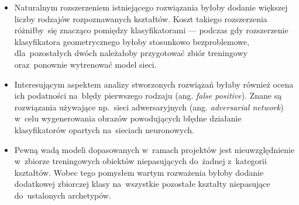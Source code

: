 \documentclass[11pt,a4paper]{article}
\begin{document}
\begin{itemize}
    \item Naturalnym rozszerzeniem istniejącego rozwiązania byłoby dodanie większej liczby rodzajów rozpoznawanych kształtów.
    Koszt takiego rozszerzenia różniłby~się znacząco pomiędzy klasyfikatorami --- podczas gdy rozszerzenie klasyfikatora geometrycznego byłoby stosunkowo bezproblemowe, dla~pozostałych dwóch należałoby przygotować zbiór treningowy oraz~ponownie wytrenować model sieci.
    \item Interesującym aspektem analizy stworzonych rozwiązań byłaby również ocena ich podatności na~błędy pierwszego rodzaju (ang. \emph{false positive}).
    Znane są rozwiązania używające np.~sieci adwersaryjnych (ang. \emph{adversarial network}) w~celu wygenerowania obrazów powodujących błędne działanie klasyfikatorów opartych na~sieciach neuronowych.
    \item Pewną wadą modeli dopasowanych w~ramach projektów jest nieuwzględnienie w~zbiorze treningowych obiektów niepasujących do~żadnej z~kategorii kształtów.
    Wobec tego pomysłem wartym rozważenia byłoby dodanie dodatkowej zbiorczej klasy na~wszystkie pozostałe kształty niepasujące do~ustalonych archetypów.
\end{itemize}
\end{document}
